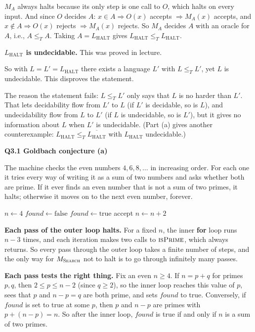 \documentclass[11pt]{article}
\newcommand{\algo}[1]{\textsc{#1}}
\newcommand{\lT}{\leq_T}
\newcommand{\Lh}{L_{\text{HALT}}}
\newcommand{\Ms}{M_{\textsc{Search}}}
\newcommand{\qpage}[1]{\clearpage\noindent\textbf{\large #1}\par\medskip}
\begin{document}
$M_A$ always halts because its only step is one call to $O$, which halts on every input.
And since $O$ decides $A$: $x \in A \Rightarrow O(x)$ accepts $\Rightarrow M_A(x)$ accepts, and $x \notin A \Rightarrow O(x)$ rejects $\Rightarrow M_A(x)$ rejects.
So $M_A$ decides $A$ with an oracle for $A$, i.e., $A \lT A$.
Taking $A = \Lh$ gives $\Lh \lT \Lh$.

\textbf{$\Lh$ is undecidable.}
This was proved in lecture.

So with $L = L' = \Lh$ there exists a language $L'$ with $L \lT L'$, yet $L$ is undecidable.
This disproves the statement.

The reason the statement fails: $L \lT L'$ only says that $L$ is no harder than $L'$.
That lets decidability flow from $L'$ to $L$ (if $L'$ is decidable, so is $L$), and undecidability flow from $L$ to $L'$ (if $L$ is undecidable, so is $L'$), but it gives no information about $L$ when $L'$ is undecidable.
(Part (a) gives another counterexample: $\Lh \lT \overline{\Lh}$ with $\Lh$ undecidable.)

\qpage{Q3.1 Goldbach conjecture (a)}

The machine checks the even numbers $4, 6, 8, \ldots$ in increasing order.
For each one it tries every way of writing it as a sum of two numbers and asks whether both are prime.
If it ever finds an even number that is not a sum of two primes, it halts; otherwise it moves on to the next even number, forever.

\begin{algorithmic}[1]
  \Function{$\Ms$}{$w$}
    \State $n \gets 4$
    \Loop
      \State $\mathit{found} \gets \text{false}$
        \If{$\algo{isPrime}(p)$ and $\algo{isPrime}(n-p)$}
          \State $\mathit{found} \gets \text{true}$
        \EndIf
      \EndFor
       \Return accept 
      \EndIf
      \State $n \gets n + 2$
    \EndLoop
  \EndFunction
\end{algorithmic}

\textbf{Each pass of the outer loop halts.}
For a fixed $n$, the inner \textbf{for} loop runs $n-3$ times, and each iteration makes two calls to $\algo{isPrime}$, which always returns.
So every pass through the outer loop takes a finite number of steps, and the only way for $\Ms$ not to halt is to go through infinitely many passes.

\textbf{Each pass tests the right thing.}
Fix an even $n \ge 4$.
If $n = p + q$ for primes $p, q$, then $2 \le p \le n-2$ (since $q \ge 2$), so the inner loop reaches this value of $p$, sees that $p$ and $n - p = q$ are both prime, and sets $\mathit{found}$ to true.
Conversely, if $\mathit{found}$ is set to true at some $p$, then $p$ and $n-p$ are primes with $p + (n-p) = n$.
So after the inner loop, $\mathit{found}$ is true if and only if $n$ is a sum of two primes.
\end{document}
